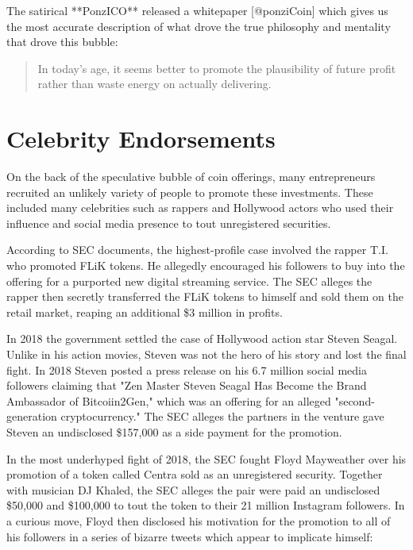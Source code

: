
The satirical **PonzICO** released a whitepaper [@ponziCoin] which gives us the
most accurate description of what drove the true philosophy and mentality that
drove this bubble:

\begin{quote}
In today's age, it seems better to promote the plausibility of future
profit rather than waste energy on actually delivering.
\end{quote}

\section{Celebrity Endorsements}

On the back of the speculative bubble of coin offerings, many entrepreneurs
recruited an unlikely variety of people to promote these investments. These
included many celebrities such as rappers and Hollywood actors who used their
influence and social media presence to tout unregistered securities.

According to SEC documents, the highest-profile case involved the rapper T.I.
who promoted FLiK tokens. He allegedly encouraged his followers to buy into the
offering for a purported new digital streaming service. The SEC alleges the
rapper then secretly transferred the FLiK tokens to himself and sold them on the
retail market, reaping an additional \$3 million in profits.


In 2018 the government settled the case of Hollywood action star Steven Seagal.
Unlike in his action movies, Steven was not the hero of his story and lost the
final fight. In 2018 Steven posted a press release on his 6.7 million social
media followers claiming that "Zen Master Steven Seagal Has Become the Brand
Ambassador of Bitcoiin2Gen," which was an offering for an alleged
"second-generation cryptocurrency." The SEC alleges the partners in the venture
gave Steven an undisclosed \$157,000 as a side payment for the promotion.


In the most underhyped fight of 2018, the SEC fought Floyd Mayweather over his
promotion of a token called Centra sold as an unregistered security. Together
with musician DJ Khaled, the SEC alleges the pair were paid an undisclosed
\$50,000 and \$100,000 to tout the token to their 21 million Instagram
followers. In a curious move, Floyd then disclosed his motivation for the
promotion to all of his followers in a series of bizarre tweets which appear to
implicate himself:

